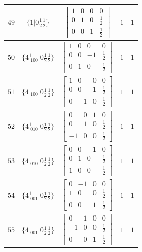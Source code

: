 \documentclass[fleqn,8pt]{jsarticle}
\begin{document}
\begin{longtable}{ccccc}
$ 49 $ & $ \{1|0 \frac{1}{2} \frac{1}{2}\} $ & $ \begin{bmatrix} 1 & 0 & 0 & 0 \\ 0 & 1 & 0 & \frac{1}{2} \\ 0 & 0 & 1 & \frac{1}{2} \end{bmatrix} $ & $ 1 $ & $ 1 $ \\ \hline
$ 50 $ & $ \{4^{+}_{\,\,100}|0 \frac{1}{2} \frac{1}{2}\} $ & $ \begin{bmatrix} 1 & 0 & 0 & 0 \\ 0 & 0 & -1 & \frac{1}{2} \\ 0 & 1 & 0 & \frac{1}{2} \end{bmatrix} $ & $ 1 $ & $ 1 $ \\ \hline
$ 51 $ & $ \{4^{-}_{\,\,100}|0 \frac{1}{2} \frac{1}{2}\} $ & $ \begin{bmatrix} 1 & 0 & 0 & 0 \\ 0 & 0 & 1 & \frac{1}{2} \\ 0 & -1 & 0 & \frac{1}{2} \end{bmatrix} $ & $ 1 $ & $ 1 $ \\ \hline
$ 52 $ & $ \{4^{+}_{\,\,010}|0 \frac{1}{2} \frac{1}{2}\} $ & $ \begin{bmatrix} 0 & 0 & 1 & 0 \\ 0 & 1 & 0 & \frac{1}{2} \\ -1 & 0 & 0 & \frac{1}{2} \end{bmatrix} $ & $ 1 $ & $ 1 $ \\ \hline
$ 53 $ & $ \{4^{-}_{\,\,010}|0 \frac{1}{2} \frac{1}{2}\} $ & $ \begin{bmatrix} 0 & 0 & -1 & 0 \\ 0 & 1 & 0 & \frac{1}{2} \\ 1 & 0 & 0 & \frac{1}{2} \end{bmatrix} $ & $ 1 $ & $ 1 $ \\ \hline
$ 54 $ & $ \{4^{+}_{\,\,001}|0 \frac{1}{2} \frac{1}{2}\} $ & $ \begin{bmatrix} 0 & -1 & 0 & 0 \\ 1 & 0 & 0 & \frac{1}{2} \\ 0 & 0 & 1 & \frac{1}{2} \end{bmatrix} $ & $ 1 $ & $ 1 $ \\ \hline
$ 55 $ & $ \{4^{-}_{\,\,001}|0 \frac{1}{2} \frac{1}{2}\} $ & $ \begin{bmatrix} 0 & 1 & 0 & 0 \\ -1 & 0 & 0 & \frac{1}{2} \\ 0 & 0 & 1 & \frac{1}{2} \end{bmatrix} $ & $ 1 $ & $ 1 $ \\ \hline

\end{longtable}
\end{document}
